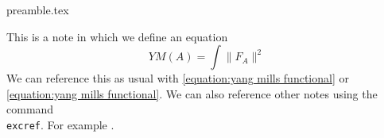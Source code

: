 
\RequirePackage{import}
{preamble.tex}



    This is a note in which we define an equation
    \begin{equation} \label{equation:yang mills functional}
        YM(A) = \int \|F_A\|^2
    \end{equation}
    We can reference this as usual with \eqref{equation:yang mills functional} or \cref{equation:yang mills functional}. We can also reference other notes using the command \texttt{\\excref}. For example .

